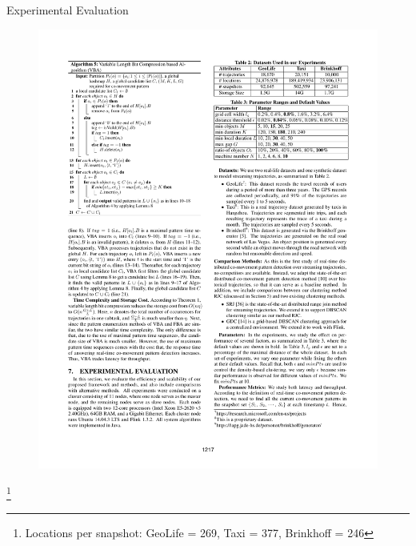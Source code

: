 \documentclass{beamer}
\newcommand\blfootnote[1]{%

  \begingroup

  \renewcommand\thefootnote{}\footnote{#1}%

  \addtocounter{footnote}{-1}%

  \endgroup

}
\begin{document}
\begin{frame}{Experimental Evaluation}
    \centering
    \begin{figure}
        \includegraphics[trim=11cm 23.5cm 1.5cm 2cm, clip, width=1\textwidth]{figures/Chen_p1217}
    \end{figure}
    \blfootnote{\tiny{Locations per snapshot: GeoLife =  269, Taxi = 377, Brinkhoff = 246}}
\end{frame}
\end{document}
